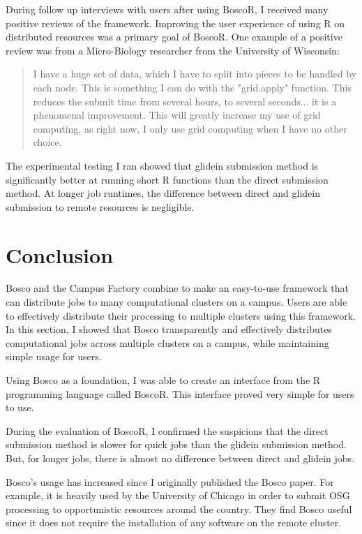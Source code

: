 During follow up interviews with users after using BoscoR, I received many positive reviews of the framework.  Improving the user experience of using R on distributed resources was a primary goal of BoscoR.  One example of a positive review was from a Micro-Biology researcher from the University of Wisconsin:
\begin{quote}
I have a huge set of data, which I have to split into pieces to be handled by each node.  This is something I can do with the "grid.apply" function. This reduces the submit time from several hours, to several seconds... it is a  phenomenal improvement. This will greatly increase my use of grid computing, as right now, I only use grid computing when I have no other choice.
\end{quote}

The experimental testing I ran showed that glidein submission method is significantly better at running short R functions than the direct submission method.  At longer job runtimes, the difference between direct and glidein submission to remote resources is negligible.






\section{Conclusion}

Bosco and the Campus Factory combine to make an easy-to-use framework that can distribute jobs to many computational clusters on a campus.  Users are able to effectively distribute their processing to multiple clusters using this framework.  In this section, I showed that Bosco transparently and effectively distributes computational jobs across multiple clusters on a campus, while maintaining simple usage for users.

Using Bosco as a foundation, I was able to create an interface from the R programming language called BoscoR.  This interface proved very simple for users to use.  

During the evaluation of BoscoR, I confirmed the suspicions that the direct submission method is slower for quick jobs than the glidein submission method.  But, for longer jobs, there is almost no difference between direct and glidein jobs.

Bosco's usage has increased since I originally published the Bosco paper.  For example, it is heavily used by the University of Chicago in order to submit OSG processing to opportunistic resources around the country.  They find Bosco useful since it does not require the installation of any software on the remote cluster.

